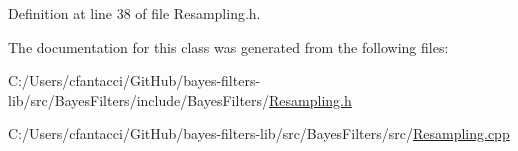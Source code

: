 Definition at line 38 of file Resampling.\+h.



The documentation for this class was generated from the following files\+:\begin{DoxyCompactItemize}
\item 
C\+:/\+Users/cfantacci/\+Git\+Hub/bayes-\/filters-\/lib/src/\+Bayes\+Filters/include/\+Bayes\+Filters/\mbox{\hyperlink{Resampling_8h}{Resampling.\+h}}\item 
C\+:/\+Users/cfantacci/\+Git\+Hub/bayes-\/filters-\/lib/src/\+Bayes\+Filters/src/\mbox{\hyperlink{Resampling_8cpp}{Resampling.\+cpp}}\end{DoxyCompactItemize}
